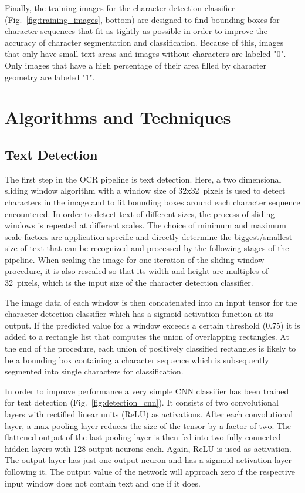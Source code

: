 \documentclass[11pt]{article}
\newcommand\figref[1]{Fig.~\ref{fig:#1}}
\begin{document}
Finally, the training images for the character detection classifier (\figref{training_images}, bottom) are
designed to find bounding boxes for character sequences that fit as tightly as possible in order to improve
the accuracy of character segmentation and classification.
%
Because of this, images that only have small
text areas and images without characters are labeled "0".
%
Only images that have a high percentage of their area filled by character geometry are labeled "1".

\section{Algorithms and Techniques}
\subsection{Text Detection}
The first step in the OCR pipeline is text detection.
%
Here, a two dimensional sliding window algorithm with a window size of 32x32~pixels is used to detect characters in the image and to fit bounding boxes
around each character sequence encountered.
%
In order to detect text of different sizes, the process of sliding windows is repeated at different
scales.
%
The choice of minimum and maximum scale factors are application specific and directly determine the
biggest/smallest size of text that can be recognized and processed by the following stages of the
pipeline.
%
When scaling the image for one iteration of the sliding window procedure, it is also rescaled
so that its width and height are multiples of 32~pixels, which is the input size of the character detection
classifier.

The image data of each window is then concatenated into an input tensor for the character detection
classifier which has a sigmoid activation function at its output.
%
If the predicted value for a window exceeds a certain threshold (0.75) it is added to a rectangle list that computes
the union of overlapping rectangles.
%
At the end of the procedure, each union of positively classified rectangles is likely to be a bounding
box containing a character sequence which is subsequently segmented into single characters for classification.

In order to improve performance a very simple CNN classifier has been trained for text detection (\figref{detection_cnn}).
It consists of two convolutional layers with rectified linear units (ReLU) as activations. After
each convolutional layer, a max pooling layer reduces the size of the tensor by a factor of two.
The flattened output of the last pooling layer is then fed into two fully connected hidden layers
with 128 output neurons each. Again, ReLU is used as activation. The output layer has just one
output neuron and has a sigmoid activation layer following it. The output value of the network
will approach zero if the respective input window does not contain text and one if it does.
\end{document}
